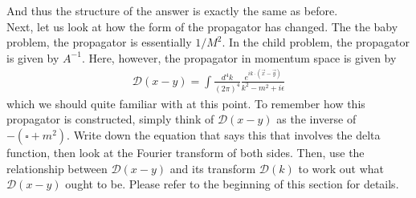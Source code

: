 \documentclass{book}
\theoremstyle{definition}
\newcommand{\f}[2]{\frac{#1}{#2}}
\newcommand{\D}{\mathcal{D}}
\begin{document}
And thus the structure of the answer is exactly the same as before. \\

Next, let us look at how the form of the propagator has changed. The the baby problem, the propagator is essentially $1/M^2$. In the child problem, the propagator is given by $A^{-1}$. Here, however, the propagator in momentum space is given by
\begin{align}
\boxed{\D(x-y) = \int \f{d^4k}{(2\pi)^4} \f{e^{ik\cdot(\vec{x} - \vec{y})}}{k^2 - m^2 + i\epsilon}}
\end{align}
which we should quite familiar with at this point. To remember how this propagator is constructed, simply think of $\D(x-y)$ as the inverse of $-(\square+m^2)$. Write down the equation that says this that involves the delta function, then look at the Fourier transform of both sides. Then, use the relationship between $\D(x-y)$ and its transform $\D(k)$ to work out what $\D(x-y)$ ought to be. Please refer to the beginning of this section for details. \\
\end{document}
